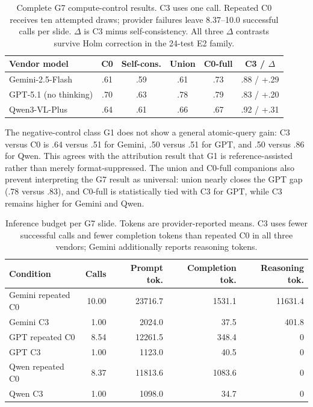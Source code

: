 \documentclass[11pt]{article}
\newcommand{\g}[1]{\textsf{#1}}
\begin{document}
\begin{table}[h]
\centering
\small
\setlength{\tabcolsep}{4pt}
\caption{Complete \g{G7} compute-control results. C3 uses one call. Repeated
C0 receives ten attempted draws; provider failures leave 8.37--10.0 successful
calls per slide. $\Delta$ is C3 minus self-consistency. All three $\Delta$
contrasts survive Holm correction in the 24-test E2 family.}
\label{tab:compute-control}
\begin{tabular}{@{}lccccc@{}}
\toprule
Vendor model & C0 & Self-cons. & Union & C0-full & C3 / $\Delta$ \\
\midrule
Gemini-2.5-Flash & .61 & .59 & .61 & .73 & .88 / +.29 \\
GPT-5.1 (no thinking) & .70 & .63 & .78 & .79 & .83 / +.20 \\
Qwen3-VL-Plus & .64 & .61 & .66 & .67 & .92 / +.31 \\
\bottomrule
\end{tabular}
\end{table}

The negative-control class \g{G1} does not show a general atomic-query gain:
C3 versus C0 is .64 versus .51 for Gemini, .50 versus .51 for GPT, and .50
versus .86 for Qwen. This agrees with the attribution result that \g{G1} is
reference-assisted rather than merely format-suppressed. The union and C0-full
companions also prevent interpreting the \g{G7} result as universal: union
nearly closes the GPT gap (.78 versus .83), and C0-full is statistically tied
with C3 for GPT, while C3 remains higher for Gemini and Qwen.

\begin{table}[h]
\centering
\small
\setlength{\tabcolsep}{4pt}
\caption{Inference budget per \g{G7} slide. Tokens are provider-reported means.
C3 uses fewer successful calls and fewer completion tokens than repeated C0 in
all three vendors; Gemini additionally reports reasoning tokens.}
\label{tab:compute-budget}
\begin{tabular}{@{}lrrrr@{}}
\toprule
Condition & Calls & Prompt tok. & Completion tok. & Reasoning tok. \\
\midrule
Gemini repeated C0 & 10.00 & 23716.7 & 1531.1 & 11631.4 \\
Gemini C3 & 1.00 & 2024.0 & 37.5 & 401.8 \\
GPT repeated C0 & 8.54 & 12261.5 & 348.4 & 0 \\
GPT C3 & 1.00 & 1123.0 & 40.5 & 0 \\
Qwen repeated C0 & 8.37 & 11813.6 & 1083.6 & 0 \\
Qwen C3 & 1.00 & 1098.0 & 34.7 & 0 \\
\bottomrule
\end{tabular}
\end{table}
\end{document}
